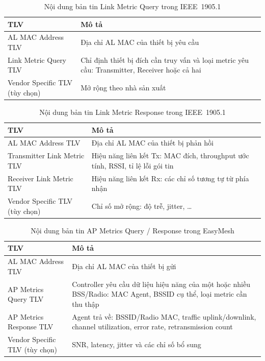 \begin{table}[ht]
	\centering
	\caption{Nội dung bản tin Link Metric Query trong IEEE~1905.1}
	\begin{tabular}{|>{\raggedright\arraybackslash}m{5cm}|>{\raggedright\arraybackslash}m{8cm}|}
		\hline
		\textbf{TLV} & \textbf{Mô tả} \\
		\hline
		AL MAC Address TLV & Địa chỉ AL MAC của thiết bị yêu cầu \\
		\hline
		Link Metric Query TLV & Chỉ định thiết bị đích cần truy vấn và loại metric yêu cầu: Transmitter, Receiver hoặc cả hai \\
		\hline
		Vendor Specific TLV (tùy chọn) & Mở rộng theo nhà sản xuất \\
		\hline
	\end{tabular}
\end{table}

\begin{table}[ht]
	\centering
	\caption{Nội dung bản tin Link Metric Response trong IEEE~1905.1}
	\begin{tabular}{|>{\raggedright\arraybackslash}m{5cm}|>{\raggedright\arraybackslash}m{8cm}|}
		\hline
		\textbf{TLV} & \textbf{Mô tả} \\
		\hline
		AL MAC Address TLV & Địa chỉ AL MAC của thiết bị phản hồi \\
		\hline
		Transmitter Link Metric TLV & Hiệu năng liên kết Tx: MAC đích, throughput ước tính, RSSI, tỉ lệ lỗi gói tin \\
		\hline
		Receiver Link Metric TLV & Hiệu năng liên kết Rx: các chỉ số tương tự từ phía nhận \\
		\hline
		Vendor Specific TLV (tùy chọn) & Chỉ số mở rộng: độ trễ, jitter, \ldots \\
		\hline
	\end{tabular}
\end{table}

\begin{table}[ht]
	\centering
	\caption{Nội dung bản tin AP Metrics Query / Response trong EasyMesh}
	\begin{tabular}{|>{\raggedright\arraybackslash}m{5cm}|>{\raggedright\arraybackslash}m{8cm}|}
		\hline
		\textbf{TLV} & \textbf{Mô tả} \\
		\hline
		AL MAC Address TLV & Địa chỉ AL MAC của thiết bị gửi \\
		\hline
		AP Metrics Query TLV & Controller yêu cầu dữ liệu hiệu năng của một hoặc nhiều BSS/Radio: MAC Agent, BSSID cụ thể, loại metric cần thu thập \\
		\hline
		AP Metrics Response TLV & Agent trả về: BSSID/Radio MAC, traffic uplink/downlink, channel utilization, error rate, retransmission count \\
		\hline
		Vendor Specific TLV (tùy chọn) & SNR, latency, jitter và các chỉ số bổ sung \\
		\hline
	\end{tabular}
\end{table}


